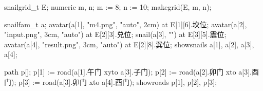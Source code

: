 \usemodule[zhfonts]
\usemodule[snail]
\startMPpage[offset=5mm]
snailgrid_t E;
numeric m, n; m := 8; n := 10;
makegrid(E, m, n);

snailfam_t a;
avatar(a[1], "m4.png", "auto", 2cm) at E[1][6].坎位;
avatar(a[2], "input.png", 3cm, "auto") at E[2][3].兑位;
snail(a[3], "") at E[3][5].震位;
avatar(a[4], "result.png", 3cm, "auto") at E[2][8].巽位;
showsnails a[1], a[2], a[3], a[4];

path p[];
p[1] := road(a[1].午门 xyto a[3].子门);
p[2] := road(a[2].卯门 xto a[3].酉门);
p[3] := road(a[3].卯门 xto a[4].酉门);
showroads p[1], p[2], p[3];
\stopMPpage
